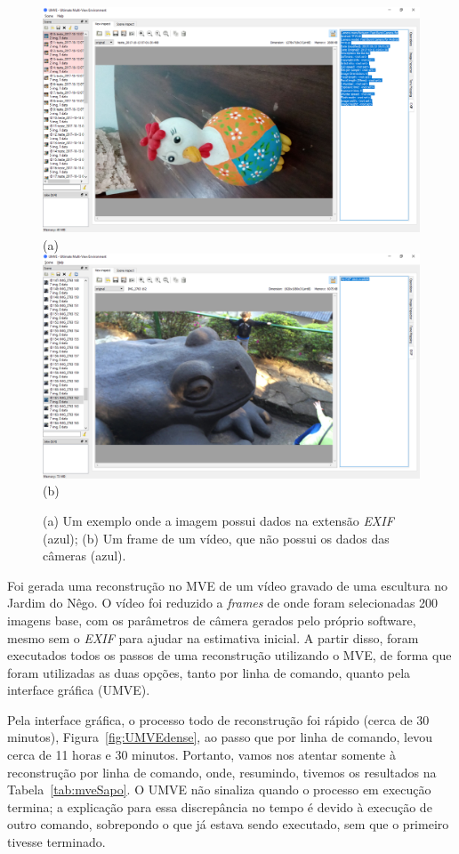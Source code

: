\begin{figure}[!h]
	\centering
	\includegraphics[width=0.461\linewidth]{figs/exifumve.png}(a)
	\includegraphics[width=0.461\linewidth]{figs/exifsemumve.png}(b)
	\caption{%
  (a) Um exemplo onde a imagem possui dados na extensão \emph{EXIF}
  (azul); (b) Um frame de um vídeo, que não
  possui os dados das câmeras (azul).
	}\label{fig:mveexif}
\end{figure} 

Foi gerada uma reconstrução no MVE de um vídeo gravado de uma escultura no Jardim do
Nêgo. O  vídeo foi reduzido a \emph{frames} de onde foram selecionadas 200 imagens base,
com os parâmetros de câmera gerados pelo próprio software, mesmo sem o
\emph{EXIF} para ajudar na estimativa inicial. 
A partir disso, foram executados todos os passos de uma reconstrução utilizando o
MVE, de forma que foram utilizadas as duas opções, tanto por linha de comando,
quanto pela interface gráfica (UMVE).

Pela interface gráfica, o processo todo de reconstrução foi rápido (cerca de 30
minutos), Figura~\ref{fig:UMVEdense}, ao passo que por linha de comando, levou cerca de
11 horas e 30 minutos. Portanto, vamos nos atentar somente à reconstrução por
linha de comando, onde, resumindo, tivemos os resultados na Tabela~\ref{tab:mveSapo}. 
O UMVE não sinaliza quando o processo em execução termina; a explicação
para essa discrepância no tempo é devido à execução de outro comando, sobrepondo
o que já estava sendo executado, sem que o primeiro tivesse terminado.

